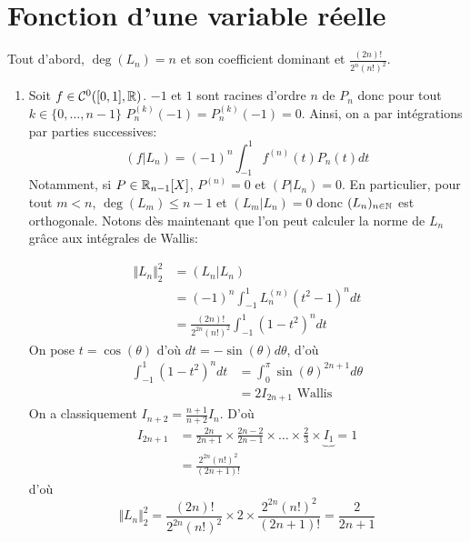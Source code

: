 \section{Fonction d'une variable réelle}

\begin{solution}
	Tout d'abord, $\deg(L_{n})=n$ et  son coefficient dominant et $\frac{(2n)!}{2^{n}(n!)^{2}}$.
	\begin{enumerate}
		\item Soit $f\in\mathcal{C}^{0}([0,1],\mathbb{R})$. $-1$ et $1$ sont racines d'ordre $n$ de $P_{n}$ donc pour tout $k\in\{0,\dots,n-1\}$ $P_{n}^{(k)}(-1)=P_{n}^{(k)}(-1)=0$. Ainsi, on a par intégrations par parties successives:
		$$(f|L_{n})=(-1)^{n}\int_{-1}^{1}f^{(n)}(t)P_{n}(t)dt$$
		Notamment, si $P\in\mathbb{R}_{n-1}[X]$, $P^{(n)}=0$ et $(P|L_{n})=0$. En particulier, pour tout $m<n$, $\deg(L_{m})\leqslant n-1$ et $(L_{m}|L_{n})=0$ donc $(L_{n})_{n\in\mathbb{N}}$ est orthogonale. Notons dès maintenant que l'on peut calculer la norme de $L_{n}$ grâce aux intégrales de Wallis:
		
		\begin{align*}
			\Vert L_{n}\Vert_{2}^{2}
			&=(L_{n}|L_{n})\\
			&=(-1)^{n}\int_{-1}^{1}L_{n}^{(n)}(t^{2}-1)^{n}dt\\
			&=\frac{(2n)!}{2^{2n}(n!)^{2}}\int_{-1}^{1}(1-t^{2})^{n}dt
		\end{align*}
		On pose $t=\cos(\theta)$ d'où $dt=-\sin(\theta)d\theta$, d'où
		\begin{align*}
			\int_{-1}^{1}(1-t^{2})^{n}dt
			&=\int_{0}^{\pi}\sin(\theta)^{2n+1}d\theta\\
			&=2I_{2n+1}\text{ Wallis }
		\end{align*}
		On a classiquement $I_{n+2}=\frac{n+1}{n+2}I_{n}$.
		D'où
		\begin{align*}
			I_{2n+1}
			&=\frac{2n}{2n+1}\times\frac{2n-2}{2n-1}\times\dots\times\frac{2}{3}\times \underbrace{I_{1}}{=1}\\
			&=\frac{2^{2n}(n!)^{2}}{(2n+1)!}
		\end{align*}
		d'où
		$$\Vert L_{n}\Vert_{2}^{2}=\frac{(2n)!}{2^{2n}(n!)^{2}}\times 2\times \frac{2^{2n}(n!)^{2}}{(2n+1)!}=\frac{2}{2n+1}$$


\end{enumerate}
\end{solution}
